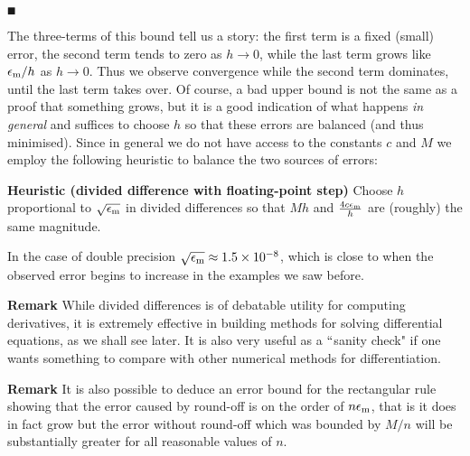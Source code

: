 \ensuremath{\QED}

The three-terms of this bound tell us a story: the first term is a fixed (small) error, the second term tends to zero as $h \rightarrow 0$, while the last term grows like $\ensuremath{\epsilon}_{\rm m}/h$ as $h \rightarrow 0$.  Thus we observe convergence while the second term dominates, until the last term takes over. Of course, a bad upper bound is not the same as a proof that something grows, but it is a good indication of what happens \emph{in general} and suffices to choose $h$ so that these errors are balanced (and thus minimised). Since in general we do not have access to the constants $c$ and $M$   we employ the following heuristic to balance the two sources of errors:

\textbf{Heuristic (divided difference with floating-point step)} Choose $h$ proportional to $\sqrt{\ensuremath{\epsilon}_{\rm m}}$ in divided differences  so that $M h$ and ${4c \ensuremath{\epsilon}_{\rm m} \over h}$ are (roughly) the same magnitude.

In the case of double precision $\sqrt{\ensuremath{\epsilon}_{\rm m}} \ensuremath{\approx} 1.5\ensuremath{\times} 10^{-8}$, which is close to when the observed error begins to increase in the examples we saw before.

\textbf{Remark} While divided differences is of debatable utility for computing derivatives, it is extremely effective in building methods for solving differential equations, as we shall see later. It is also very useful as a \ensuremath{\ldq}sanity check" if one wants something to compare with other numerical methods for differentiation.

\textbf{Remark} It is also possible to deduce an error bound for the rectangular rule showing that the error caused by round-off is on the order of $n \ensuremath{\epsilon}_{\rm m}$, that is it does in fact grow but the error without round-off which was bounded by $M/n$ will be substantially greater for all reasonable values of $n$.



